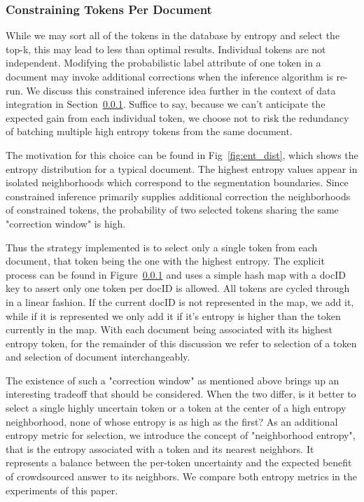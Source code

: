 \subsubsection{Constraining Tokens Per Document}
While we may sort all of the tokens in the database by entropy and select the top-k, this may lead to less than optimal results.  Individual tokens are not independent.  Modifying the probabilistic label attribute of one token in a document may invoke additional corrections when the inference algorithm is re-run.  We discuss this constrained inference idea further in the context of data integration in Section~\ref{}.  Suffice to say, because we can't anticipate the expected gain from each individual token, we choose not to risk the redundancy of batching multiple high entropy tokens from the same document.

The motivation for this choice can be found in Fig~\ref{fig:ent_dist}, which shows the entropy distribution for a typical document.  The highest entropy values appear in isolated neighborhoods which correspond to the segmentation boundaries.  Since constrained inference primarily supplies additional correction the neighborhoods of constrained tokens, the probability of two selected tokens sharing the same "correction window" is high.  

Thus the strategy implemented is to select only a single token from each document, that token being the one with the highest entropy.  The explicit process can be found in Figure~\ref{} and uses a simple hash map with a docID key to assert only one token per docID is allowed.  All tokens are cycled through in a linear fashion.  If the current docID is not represented in the map, we add it, while if it is represented we only add it if it's entropy is higher than the token currently in the map.  With each document being associated with its highest entropy token, for the remainder of this discussion we refer to selection of a token and selection of document interchangeably.

The existence of such a "correction window" as mentioned above brings up an interesting tradeoff that should be considered.  When the two differ, is it better to select a single highly uncertain token or a token at the center of a high entropy neighborhood, none of whose entropy is as high as the first?  As an additional entropy metric for selection, we introduce the concept of "neighborhood entropy", that is the entropy associated with a token and its nearest neighbors.  It represents a balance between the per-token uncertainty and the expected benefit of crowdsourced answer to its neighbors.  We compare both entropy metrics in the experiments of this paper. 


